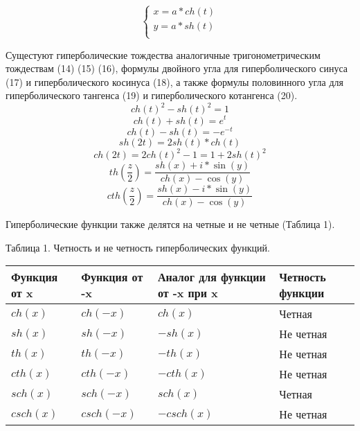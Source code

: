 \documentclass{article}
\begin{document}
\begin{equation}
    \begin{cases}
        x = a * ch(t)\\
        y = a * sh(t)\\
    \end{cases}
\end{equation}

Сущестуют гиперболические тождества аналогичные тригонометрическим тождествам (14) (15) (16), формулы двойного угла для гиперболического синуса (17) и гиперболического косинуса (18), а также формулы половинного угла для гиперболического тангенса (19) и гиперболического котангенса (20).
\begin{equation}
    ch(t)^2 - sh(t)^2 = 1
\end{equation}
\begin{equation}
    ch(t) + sh(t) = e^t
\end{equation}
\begin{equation}
    ch(t) - sh(t) = -e^{-t}
\end{equation}
\begin{equation}
    sh(2t) = 2sh(t)*ch(t)
\end{equation}
\begin{equation}
    ch(2t) = 2ch(t)^2 - 1 = 1 + 2sh(t)^2
\end{equation}
\begin{equation}
    th(\frac{z}{2})=\frac{sh(x)+i*\sin(y)}{ch(x)-\cos(y)}
\end{equation}
\begin{equation}
    cth(\frac{z}{2})=\frac{sh(x)-i*\sin(y)}{ch(x)-\cos(y)}
\end{equation}

Гиперболические функции также делятся на четные и не четные (Таблица 1).

Таблица 1. Четность и не четность гиперболических функций.
\begin{center}
\begin{tabular}{| p{3cm} | p{3cm} | p{3cm} | p{3cm} |}
    \hline
    Функция от x & Функция от -x & Аналог для функции от -x при x & Четность функции \\ \hline
    $ch(x)$ & $ch(-x)$ & $ch(x)$ & Четная  \\ \hline
    $sh(x)$ & $sh(-x)$ & $-sh(x)$ & Не четная \\\hline
    $th(x)$ & $th(-x)$ & $-th(x)$ &  Не четная  \\ \hline
    $cth(x)$ & $cth(-x)$ & $-cth(x)$ &  Не четная \\ \hline
    $sch(x)$ & $sch(-x)$ & $sch(x)$ & Четная \\ \hline
    $csch(x)$ & $csch(-x)$ & $-csch(x)$ &  Не четная \\ \hline
    \hline
\end{tabular}
\end{center}
\end{document}
